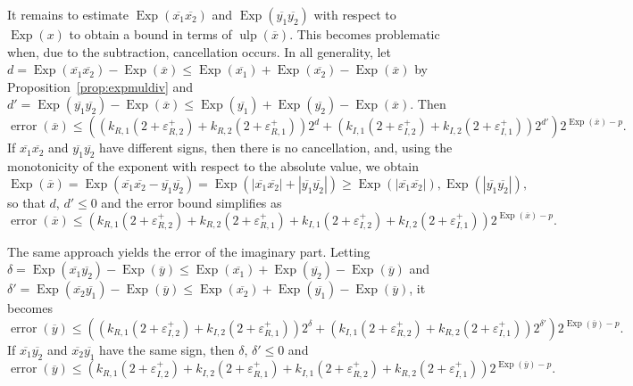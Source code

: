 \documentclass {article}
\newcommand {\appro}[1]{\overline {#1}}
\newcommand {\Ulp}{{\operatorname {ulp}}}
\DeclareMathOperator{\Exp}{\operatorname {Exp}}
\newcommand{\error}{\operatorname {error}}
\renewcommand {\epsilon}{\varepsilon}
\renewcommand {\leq}{\leqslant}
\renewcommand {\geq}{\geqslant}
\begin{document}
It remains to estimate $\Exp (\appro {x_1} \appro {x_2})$ and
$\Exp (\appro {y_1} \appro {y_2})$ with respect to $\Exp (x)$ to obtain
a bound in terms of $\Ulp (\appro x)$. This becomes problematic when, due
to the subtraction, cancellation occurs. In all generality, let
$d = \Exp (\appro {x_1} \appro {x_2}) - \Exp (\appro x)
\leq \Exp (\appro {x_1}) + \Exp (\appro {x_2}) - \Exp (\appro x)$
by Proposition~\ref {prop:expmuldiv} and
$d' = \Exp( \appro {y_1} \appro {y_2}) - \Exp (\appro x)
\leq \Exp (\appro {y_1}) + \Exp (\appro {y_2}) - \Exp (\appro x)$.
Then
\begin {equation}
\label {eq:propmulre}
\error( \appro x) \leq \left(
   \left( k_{R, 1} (2 + \epsilon_{R, 2}^+)
   + k_{R, 2} (2 + \epsilon_{R, 1}^+) \right) 2^d
   + \left( k_{I, 1} (2 + \epsilon_{I, 2}^+)
   + k_{I, 2} (2 + \epsilon_{I, 1}^+) \right) 2^{d'}
   \right) 2^{\Exp (\appro x) - p}.
\end {equation}
If $\appro {x_1} \appro {x_2}$ and $\appro {y_1} \appro {y_2}$ have different
signs, then there is no cancellation, and, using the monotonicity of the
exponent with respect to the absolute value, we obtain
\[
\Exp (\appro x) = \Exp (\appro {x_1} \appro {x_2} - \appro {y_1} \appro {y_2})
= \Exp (|\appro {x_1} \appro {x_2}| + |\appro {y_1} \appro {y_2}|)
\geq \Exp (|\appro {x_1} \appro {x_2}|), \Exp (|\appro {y_1} \appro {y_2}|),
\]
so that $d$, $d' \leq 0$ and the error bound simplifies as
\[
\error( \appro x) \leq \left(
   k_{R, 1} (2 + \epsilon_{R, 2}^+)
   + k_{R, 2} (2 + \epsilon_{R, 1}^+)
   + k_{I, 1} (2 + \epsilon_{I, 2}^+)
   + k_{I, 2} (2 + \epsilon_{I, 1}^+)
   \right) 2^{\Exp (\appro x) - p}.
\]

The same approach yields the error of the imaginary part. Letting
$\delta = \Exp (\appro {x_1} \appro {y_2}) - \Exp (\appro y)
\leq \Exp( \appro {x_1}) + \Exp (\appro {y_2}) - \Exp (\appro y)$ and
$\delta' = \Exp (\appro {x_2} \appro {y_1}) - \Exp (\appro {y})
\leq \Exp (\appro {x_2}) + \Exp (\appro {y_1}) - \Exp (\appro y)$,
it becomes
\begin {equation}
\label {eq:propmulim}
\error( \appro y) \leq \left(
   \left( k_{R, 1} (2 + \epsilon_{I, 2}^+)
   + k_{I, 2} (2 + \epsilon_{R, 1}^+) \right) 2^{\delta}
   + \left( k_{I, 1} (2 + \epsilon_{R, 2}^+)
   + k_{R, 2} (2 + \epsilon_{I, 1}^+) \right) 2^{\delta'}
   \right) 2^{\Exp (\appro y) - p}.
\end {equation}
If $\appro {x_1} \appro {y_2}$ and $\appro {x_2} \appro {y_1}$ have
the same sign, then $\delta$, $\delta' \leq 0$ and
\[
\error( \appro y) \leq \left(
   k_{R, 1} (2 + \epsilon_{I, 2}^+)
   + k_{I, 2} (2 + \epsilon_{R, 1}^+)
   + k_{I, 1} (2 + \epsilon_{R, 2}^+)
   + k_{R, 2} (2 + \epsilon_{I, 1}^+)
   \right) 2^{\Exp (\appro y) - p}.
\]
\end{document}
